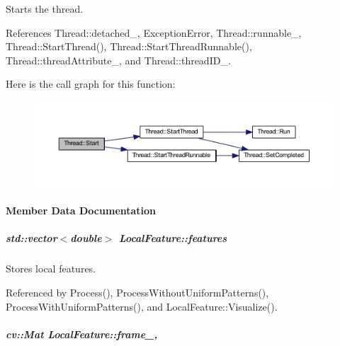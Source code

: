 Starts the thread. 



References Thread\-::detached\-\_\-, Exception\-Error, Thread\-::runnable\-\_\-, Thread\-::\-Start\-Thread(), Thread\-::\-Start\-Thread\-Runnable(), Thread\-::thread\-Attribute\-\_\-, and Thread\-::thread\-I\-D\-\_\-.



Here is the call graph for this function\-:
\nopagebreak
\begin{figure}[H]
\begin{center}
\leavevmode
\includegraphics[width=350pt]{group___core_a2b42f82341afd2747ea093b6ac8b91cb_cgraph}
\end{center}
\end{figure}




\paragraph{Member Data Documentation}
\hypertarget{group___feature_extractor_a8197cec0d029bac380885167df9f65e5}{
\subparagraph[{features}]{\setlength{\rightskip}{0pt plus 5cm}std\-::vector$<$double$>$ Local\-Feature\-::features\hspace{0.3cm}{\ttfamily [inherited]}}}\label{group___feature_extractor_a8197cec0d029bac380885167df9f65e5}


Stores local features. 



Referenced by Process(), Process\-Without\-Uniform\-Patterns(), Process\-With\-Uniform\-Patterns(), and Local\-Feature\-::\-Visualize().

\hypertarget{group___feature_extractor_a585b0dc6e6184422c5563e80bff50ffa}{
\subparagraph[{frame\-\_\-}]{\setlength{\rightskip}{0pt plus 5cm}cv\-::\-Mat Local\-Feature\-::frame\-\_\-\hspace{0.3cm}{\ttfamily [protected]}, {\ttfamily [inherited]}}}\label{group___feature_extractor_a585b0dc6e6184422c5563e80bff50ffa}


